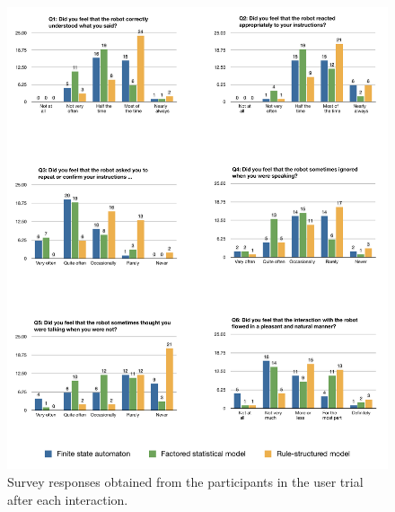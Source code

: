 

\begin{figure}[p]
\begin{center}
\includegraphics[scale=0.5]{imgs/subjective.pdf}
\end{center} 
\caption{Survey responses obtained from the participants in the user trial after each interaction. }
\label{fig:subjective}
\end{figure}


